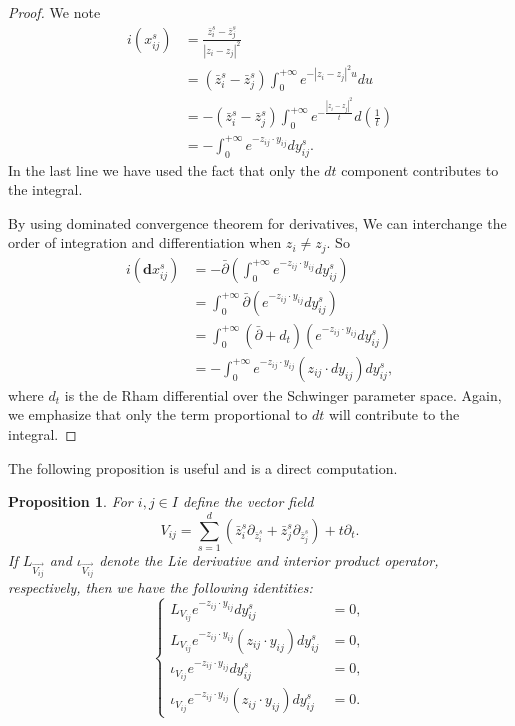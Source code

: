 \documentclass[11pt]{amsart}
\newtheorem{prop}[thm]{Proposition}
\theoremstyle{definition}
\theoremstyle{remark}
\numberwithin{equation}{section}
\begin{document}
\begin{proof}
    We note
    \begin{align*}
        i(x_{ij}^{s})
        &=
        \frac{\bar{z}_{i}^{s} - \bar{z}_{j}^{s}}{|z_{i} - z_{j}|^{2}}\\
        &=
        (\bar{z}_{i}^{s} - \bar{z}_{j}^{s})\int_{0}^{+\infty}e^{-|z_{i} - z_{j}|^{2}u}du\\
        &=
        -(\bar{z}_{i}^{s} - \bar{z}_{j}^{s})\int_{0}^{+\infty}e^{-\frac{|z_{i} - z_{j}|^{2}}{t}}d\left(\frac{1}{t}\right)\\
        &=
        -\int_{0}^{+\infty}e^{-z_{ij}\cdot y_{ij}}dy_{ij}^{s}.
    \end{align*}
    In the last line we have used the fact that only the $d t$ component contributes to the integral.

    By using dominated convergence theorem for derivatives, We can interchange the order of integration and differentiation when $z_{i}\neq z_{j}$. So
    \begin{align*}
        i(\mathbf{d}x_{ij}^{s})
        &=
        -\bar{\partial}\left(\int_{0}^{+\infty}e^{-z_{ij}\cdot y_{ij}}dy_{ij}^{s}\right)\\
        &=
        \int_{0}^{+\infty}\bar{\partial}\left(e^{-z_{ij}\cdot y_{ij}}dy_{ij}^{s}\right)\\
        &=
        \int_{0}^{+\infty}(\bar{\partial}+d_{t})\left(e^{-z_{ij}\cdot y_{ij}}dy_{ij}^{s}\right)\\
        &=
        -\int_{0}^{+\infty}e^{-z_{ij}\cdot y_{ij}}(z_{ij}\cdot dy_{ij})dy_{ij}^{s},
    \end{align*}
    where $d_t$ is the de Rham differential over the Schwinger parameter space.
    Again, we emphasize that only the term proportional to $dt$ will contribute to the integral.
\end{proof}

The following proposition is useful and is a direct computation.

\begin{prop}\label{Lie and interior product}
    For $i,j \in  I$ define the vector field
    $$ V_{ij}=\sum_{s=1}^{d}(\bar{z}_i^s\partial_{\bar{z}_{i}^{s}}+\bar{z}_j^s\partial_{\bar{z}_{j}^{s}})+t\partial_{t}.
    $$
    If $L_{\vec{V_{ij}}}$ and $\iota_{\vec{V_{ij}}}$ denote the Lie derivative and interior product operator, respectively, then we have the following identities:
$$
\left\{
\begin{array}{cc}
     L_{V_{ij}}e^{-z_{ij}\cdot y_{ij}}dy_{ij}^s & =0,  \\
      L_{ V_{ij}}e^{-z_{ij}\cdot y_{ij}}(z_{ij}\cdot y_{ij})dy_{ij}^s & =0,\\
      \iota_{ V_{ij}}e^{-z_{ij}\cdot y_{ij}}dy_{ij}^s & =0,\\
      \iota_{ V_{ij}}e^{-z_{ij}\cdot y_{ij}}(z_{ij}\cdot y_{ij})dy_{ij}^s & =0.
\end{array}
\right.
$$
\end{prop}
\end{document}
